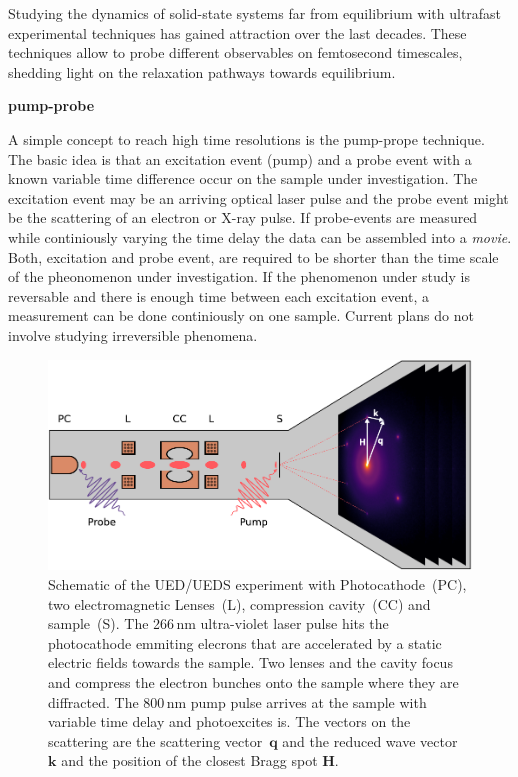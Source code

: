 Studying the dynamics of solid-state systems far from equilibrium with ultrafast experimental techniques has gained attraction over the last decades.
These techniques allow to probe different observables on femtosecond timescales, shedding light on the relaxation pathways towards equilibrium.

\textbf{pump-probe}

A simple concept to reach high time resolutions is the pump-prope technique.
The basic idea is that an excitation event (pump) and a probe event with a known variable time difference occur on the sample under investigation.
The excitation event may be an arriving optical laser pulse and the probe event might be the scattering of an electron or X-ray pulse.
If probe-events are measured while continiously varying the time delay the data can be assembled into a \emph{movie}.
Both, excitation and probe event, are required to be shorter than the time scale of the pheonomenon under investigation.
If the phenomenon under study is reversable and there is enough time between each excitation event, a measurement can be done continiously on one sample.
Current plans do not involve studying irreversible phenomena.

\begin{figure}[!t]
	\includegraphics[width=\columnwidth]{figs/ued.pdf}
	\caption{Schematic of the UED/UEDS experiment with Photocathode~(PC), two electromagnetic Lenses~(L), compression cavity~(CC) and sample~(S). The 266\,nm ultra-violet laser pulse hits the photocathode emmiting elecrons that are accelerated by a static electric fields towards the sample. Two lenses and the cavity focus and compress the electron bunches onto the sample where they are diffracted. The 800\,nm pump pulse arrives at the sample with variable time delay and photoexcites is. The vectors on the scattering are the scattering vector~$\mathbf{q}$ and the reduced wave vector~$\mathbf{k}$ and the position of the closest Bragg spot $\mathbf{H}$.}
	\label{fig:ued}
\end{figure}

